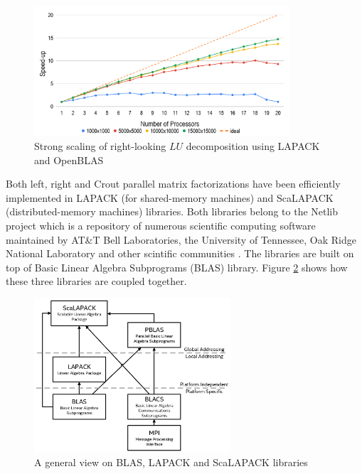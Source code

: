\figpointer{\ref{fig:lapack-lu-strong-scaling}}
\begin{figure}[htpb]
  \centering
  \includegraphics[width=0.85\textwidth]{figures/chapter-2/lapack-lu-strong-scaling.png}
\caption{Strong scaling of right-looking $LU$ decomposition using LAPACK and OpenBLAS}
\label{fig:lapack-lu-strong-scaling}
\end{figure}



Both left, right and Crout parallel matrix factorizations have been efficiently implemented in LAPACK (for shared-memory machines) and ScaLAPACK (distributed-memory machines) libraries. Both libraries belong to the Netlib project which is a repository of numerous scientific computing software maintained by AT\&T Bell Laboratories, the University of Tennessee, Oak Ridge National Laboratory and other scintific communities \cite{netlib-overview}. The libraries are built on top of Basic Linear Algebra Subprograms (BLAS) library. Figure \ref{fig:blas-lapack-scalapack} shows how these three libraries are coupled together.\\


\figpointer{\ref{fig:blas-lapack-scalapack}}
\begin{figure}[htpb]
  \centering
  \includegraphics[width=0.65\textwidth]{figures/chapter-2/lapack-scalapack-blas.png}
\caption{A general view on BLAS, LAPACK and ScaLAPACK libraries \cite{netlib:lapack-scalapack-general-view}}
\label{fig:blas-lapack-scalapack}
\end{figure}

